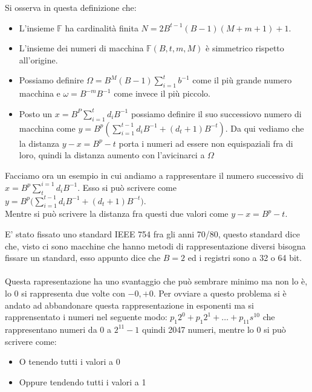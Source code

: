 \hspace{-15pt}Si osserva in questa definizione che:
\begin{itemize}
    \item L'insieme \(\mathbb{F}\) ha cardinalità finita \(N = 2B^{t-1}(B-1)(M + m + 1) + 1\).
    \item L'insieme dei numeri di macchina \(\mathbb{F}(B, t, m, M)\) è simmetrico rispetto all'origine.
    \item Possiamo definire \(\Omega = B^M (B-1) \sum_{i=1}^{t} b^{-1}\) come il più grande numero macchina e \(\omega = B^{-m} B^{-1}\) come
    invece il più piccolo.
    \item Posto un \(x = B^P \sum_{i=1}^{t}d_i B^{-1}\) possiamo definire il suo successiovo numero di macchina come
    \(y = B^p(\sum_{i=1}^{t-1}d_i B^{-1} + (d_t + 1)B^{-t})\). Da qui vediamo che la distanza \(y - x = B^p - t\) porta
    i numeri ad essere non equispaziali fra di loro, quindi la distanza aumento con l'avicinarci a \(\Omega\)
\end{itemize}

\begin{example}
    Facciamo ora un esempio in cui andiamo a rappresentare il numero successivo di \(x = B^p \sum_{t}^{i=1} d_i B^{-1}\). Esso
    si può scrivere come \(y = B^p \bigg( \sum_{i=1}^{t-1} d_i B^{-1} + (d_t + 1)B^{-t} \bigg)\).\\
    Mentre si può scrivere la distanza fra questi due valori come \(y - x = B^p - t\).
\end{example}

\hspace{-15pt}E' stato fissato uno standard IEEE 754 fra gli anni 70/80, questo standard dice che, visto ci sono macchine che hanno metodi di rappresentazione
diversi bisogna fissare un standard, esso appunto dice che \(B = 2\) ed i registri sono a 32 o 64 bit.\\\\
Questa rapresentazione ha uno svantaggio che può sembrare minimo ma non lo è, lo 0 si rappresenta due volte con \(-0, +0\). Per ovviare
a questo problema si è andato ad abbandonare questa rappresentazione in esponenti ma si rapprensentato i numeri nel seguente modo:
\(p_1 2^0 + p_1 2^1 + \dots + p_11 s^10 \) che rappresentano numeri da 0 a \(2^11 - 1\) quindi 2047 numeri, mentre lo 0 si può scrivere come:
\begin{itemize}
    \item O tenendo tutti i valori a 0
    \item Oppure tendendo tutti i valori a 1
\end{itemize}

